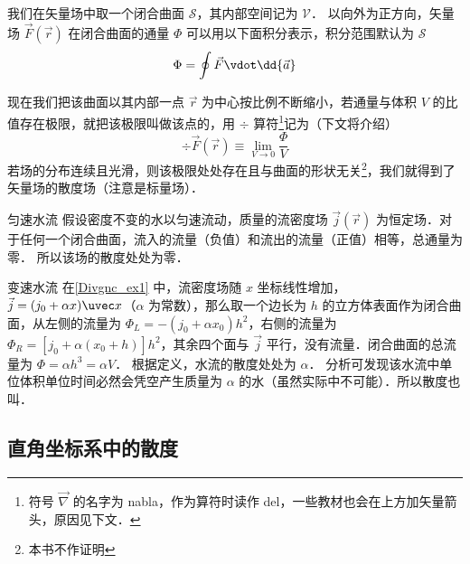 
我们在矢量场中取一个闭合曲面 $\mathcal{S}$，其内部空间记为 $\mathcal{V}$． 以向外为正方向，矢量场 $\vec F(\vec r)$ 在闭合曲面的通量 $\Phi$ 可以用以下面积分表示，积分范围默认为 $\mathcal{S}$
\begin{equation}
\Phi  = \oint \vec F \vdot \dd{\vec a}
\end{equation}

现在我们把该曲面以其内部一点 $\vec r$ 为中心按比例不断缩小，若通量与体积 $V$ 的比值存在极限，就把该极限叫做该点的，用 $\div$ 算符\footnote{符号 $\vec\nabla$ 的名字为 nabla，作为算符时读作 del，一些教材也会在上方加矢量箭头，原因见下文．}记为（下文将介绍）
\begin{equation}\label{Divgnc_eq2}
\div \vec F(\vec r) \equiv \lim_{V \to 0} \frac{\Phi }{V}
\end{equation}
若场的分布连续且光滑，则该极限处处存在且与曲面的形状无关\footnote{本书不作证明}，我们就得到了矢量场的散度场（注意是标量场）．

\begin{exam}{匀速水流}\label{Divgnc_ex1}
假设密度不变的水以匀速流动，质量的流密度场 $\vec j(\vec r)$ 为恒定场．对于任何一个闭合曲面，流入的流量（负值）和流出的流量（正值）相等，总通量为零． 所以该场的散度处处为零．
\end{exam}

\begin{exam}{变速水流}
在\autoref{Divgnc_ex1} 中，流密度场随 $x$ 坐标线性增加， $\vec j = (j_0 + \alpha x)\uvec x$（$\alpha$ 为常数），那么取一个边长为 $h$ 的立方体表面作为闭合曲面，从左侧的流量为 $\Phi_L =  - (j_0 + \alpha x_0) h^2$，右侧的流量为 $\Phi_R = [j_0 + \alpha (x_0 + h)] h^2$，其余四个面与 $\vec j$ 平行，没有流量．闭合曲面的总流量为 $\Phi  = \alpha h^3 = \alpha V$． 根据定义，水流的散度处处为 $\alpha$． 分析可发现该水流中单位体积单位时间必然会凭空产生质量为 $\alpha$ 的水（虽然实际中不可能）．所以散度也叫．
\end{exam}

\subsection{直角坐标系中的散度}

